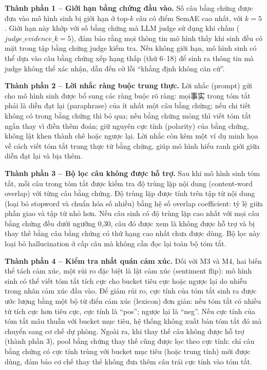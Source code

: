 \documentclass[12pt,a4paper]{report}
\begin{document}
\textbf{Thành phần 1 -- Giới hạn bằng chứng đầu vào.} Số câu bằng chứng được đưa vào mô hình sinh bị giới hạn ở top-$k$ câu có điểm SemAE cao nhất, với $k=5$. Giới hạn này khớp với số bằng chứng mà LLM judge sử dụng khi chấm ($judge\_evidence\_k = 5$), đảm bảo rằng mọi thông tin mô hình thấy khi sinh đều có mặt trong tập bằng chứng judge kiểm tra. Nếu không giới hạn, mô hình sinh có thể dựa vào câu bằng chứng xếp hạng thấp (thứ 6--18) để sinh ra thông tin mà judge không thể xác nhận, dẫn đến cờ lỗi ``khẳng định không căn cứ''.

\textbf{Thành phần 2 -- Lời nhắc ràng buộc trung thực.} Lời nhắc (prompt) gửi cho mô hình sinh được bổ sung các ràng buộc rõ ràng: mọi事实 trong tóm tắt phải là diễn đạt lại (paraphrase) của ít nhất một câu bằng chứng; nếu chi tiết không có trong bằng chứng thì bỏ qua; nếu bằng chứng mỏng thì viết tóm tắt ngắn thay vì điền thêm đoán; giữ nguyên cực tính (polarity) của bằng chứng, không lật khen thành chê hoặc ngược lại. Lời nhắc còn kèm một ví dụ minh họa về cách viết tóm tắt trung thực từ bằng chứng, giúp mô hình hiểu ranh giới giữa diễn đạt lại và bịa thêm.

\textbf{Thành phần 3 -- Bộ lọc câu không được hỗ trợ.} Sau khi mô hình sinh tóm tắt, mỗi câu trong tóm tắt được kiểm tra độ trùng lặp nội dung (content-word overlap) với từng câu bằng chứng. Độ trùng lặp được tính trên tập từ nội dung (loại bỏ stopword và chuẩn hóa số nhiều) bằng hệ số overlap coefficient: tỷ lệ giữa phần giao và tập từ nhỏ hơn. Nếu câu sinh có độ trùng lặp cao nhất với mọi câu bằng chứng đều dưới ngưỡng 0{,}30, câu đó được xem là không được hỗ trợ và bị thay thế bằng câu bằng chứng có thứ hạng cao nhất chưa được dùng. Bộ lọc này loại bỏ hallucination ở cấp câu mà không cần đọc lại toàn bộ tóm tắt.

\textbf{Thành phần 4 -- Kiểm tra nhất quán cảm xúc.} Đối với M3 và M4, hai biến thể tách cảm xúc, một rủi ro đặc biệt là lật cảm xúc (sentiment flip): mô hình sinh có thể viết tóm tắt tích cực cho bucket tiêu cực hoặc ngược lại do nhiễu trong nhãn cảm xúc đầu vào. Để giảm rủi ro, cực tính của tóm tắt sinh ra được ước lượng bằng một bộ từ điển cảm xúc (lexicon) đơn giản: nếu tóm tắt có nhiều từ tích cực hơn tiêu cực, cực tính là ``pos''; ngược lại là ``neg''. Nếu cực tính của tóm tắt mâu thuẫn với bucket mục tiêu, hệ thống không xuất bản tóm tắt đó mà chuyển sang cơ chế dự phòng. Ngoài ra, khi thay thế câu không được hỗ trợ (thành phần 3), pool bằng chứng thay thế cũng được lọc theo cực tính: chỉ câu bằng chứng có cực tính trùng với bucket mục tiêu (hoặc trung tính) mới được dùng, đảm bảo cơ chế thay thế không đưa thêm câu trái cực tính vào tóm tắt.
\end{document}
